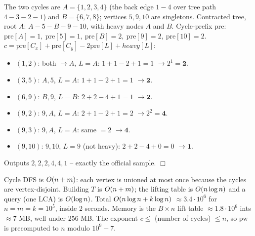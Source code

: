 \begin{tracebox}
The two cycles are \(A=\{1,2,3,4\}\) (the back edge \(1\!-\!4\) over tree path \(4\!-\!3\!-\!2\!-\!1\))
and \(B=\{6,7,8\}\); vertices \(5,9,10\) are singletons.  Contracted tree,
root \(A\): \(A - 5 - B - 9 - 10\), with heavy nodes \(A\) and \(B\).
Cycle-prefix \(\mathrm{pre}\): \(\mathrm{pre}[A]{=}1,\ \mathrm{pre}[5]{=}1,\ \mathrm{pre}[B]{=}2,\ \mathrm{pre}[9]{=}2,\ \mathrm{pre}[10]{=}2\).\quad
\textbf{\(c=\mathrm{pre}[C_x]+\mathrm{pre}[C_y]-2\mathrm{pre}[L]+\mathit{heavy}[L]\)}:
\begin{itemize}[nosep,leftmargin=1.4em]
  \item \((1,2)\): both \(\to A\), \(L{=}A\): \(1{+}1{-}2{+}1=1\) \(\to 2^{1}=\mathbf{2}\).
  \item \((3,5)\): \(A,5\), \(L{=}A\): \(1{+}1{-}2{+}1=1\) \(\to \mathbf{2}\).
  \item \((6,9)\): \(B,9\), \(L{=}B\): \(2{+}2{-}4{+}1=1\) \(\to \mathbf{2}\).
  \item \((9,2)\): \(9,A\), \(L{=}A\): \(2{+}1{-}2{+}1=2\) \(\to 2^{2}=\mathbf{4}\).
  \item \((9,3)\): \(9,A\), \(L{=}A\): same \(=2\) \(\to \mathbf{4}\).
  \item \((9,10)\): \(9,10\), \(L{=}9\) (not heavy): \(2{+}2{-}4{+}0=0\) \(\to \mathbf{1}\).
\end{itemize}
Outputs \(2,2,2,4,4,1\) -- exactly the official sample. \(\Box\)
\end{tracebox}

\begin{complexitybox}
Cycle DFS is \(O(n+m)\): each vertex is unioned at most once because the cycles
are vertex-disjoint.  Building \(T\) is \(O(n+m)\); the lifting table is
\(O(n\log n)\) and a query (one LCA) is \(O(\log n)\).  Total
\(O(n\log n + k\log n)\) \(\approx 3.4\cdot 10^{6}\) for \(n=m=k=10^{5}\), inside 2
seconds.  Memory is the \(B\times n\) lift table \(\approx 1.8\cdot 10^{6}\) ints
\(\approx 7\) MB, well under 256 MB.  The exponent \(c\le\) (number of cycles) \(\le n\),
so \(\mathrm{pw}\) is precomputed to \(n\) modulo \(10^{9}{+}7\).
\end{complexitybox}

